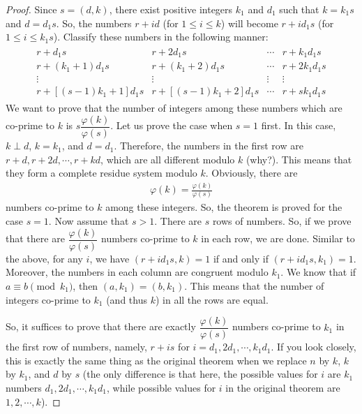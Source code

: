 \documentclass[12pt]{subfile}
\begin{document}
\begin{proof}
			Since $s=(d,k)$, there exist positive integers $k_1$ and $d_1$ such that $k = k_1s$ and $d = d_1s$. So, the numbers $r+id$ (for $1 \leq  i \leq k$) will become $r+id_1s$ (for $1 \leq i \leq k_1s$). Classify these numbers in the following manner:
				\begin{align*}
					 \begin{matrix}
						 r+d_1s&r+2d_1s&\cdots&r+k_1d_1s\\
						 r+(k_1+1)d_1s&r+(k_1+2)d_1s&\cdots&r+2k_1d_1s\\
						 \vdots&\vdots&\vdots&\vdots\\
						 r+[(s-1)k_1+1]d_1s&r+[(s-1)k_1+2]d_1s&\cdots&r+sk_1d_1s
					 \end{matrix}
				\end{align*}
			We want to prove that the number of integers among these numbers which are co-prime to $k$ is $s \dfrac{\varphi(k)}{\varphi(s)}$. Let us prove the case when $s=1$ first. In this case, $k \perp d$, $k=k_1$, and $d=d_1$. Therefore, the numbers in the first row are $r+d, r+2d, \cdots, r+kd$, which are all different modulo $k$ (why?). This means that they form a complete residue system modulo $k$. Obviously, there are
				\begin{align*}
					\varphi(k) = \frac{\varphi(k)}{\varphi(s)}
				\end{align*}
			numbers co-prime to $k$ among these integers. So, the theorem is proved for the case $s=1$.
			Now assume that $s>1$. There are $s$ rows of numbers. So, if we prove that there are $\dfrac{\varphi(k)}{\varphi(s)}$ numbers co-prime to $k$ in each row, we are done. Similar to the above, for any $i$, we have $(r+id_1s, k)=1$ if and only if $(r+id_1s, k_1)=1$. Moreover, the numbers in each column are congruent modulo $k_1$. We know that if $a \equiv b \pmod{k_1}$, then $(a, k_1) = (b, k_1)$. This means that the number of integers co-prime to $k_1$ (and thus $k$) in all the rows are equal.

			So, it suffices to prove that there are exactly $\dfrac{\varphi(k)}{\varphi(s)}$ numbers co-prime to $k_1$ in the first row of numbers, namely, $r+is$ for $i=d_1,2d_1,\cdots,k_1d_1$. If you look closely, this is exactly the same thing as the original theorem when we replace $n$ by $k$, $k$ by $k_1$, and $d$ by $s$ (the only difference is that here, the possible values for $i$ are $k_1$ numbers $d_1,2d_1,\cdots,k_1d_1$, while possible values for $i$ in the original theorem are $1,2,\cdots,k$).


\end{proof}
\end{document}
